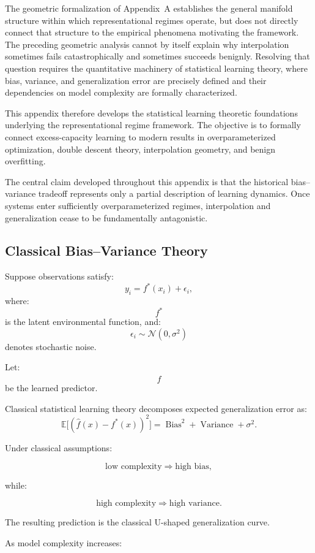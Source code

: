 \documentclass[12pt,a4paper]{article}
\begin{document}
The geometric formalization of Appendix~A establishes the general manifold structure within which representational regimes operate, but does not directly connect that structure to the empirical phenomena motivating the framework. The preceding geometric analysis cannot by itself explain why interpolation sometimes fails catastrophically and sometimes succeeds benignly. Resolving that question requires the quantitative machinery of statistical learning theory, where bias, variance, and generalization error are precisely defined and their dependencies on model complexity are formally characterized.

This appendix therefore develops the statistical learning theoretic foundations underlying the representational regime framework. The objective is to formally connect excess-capacity learning to modern results in overparameterized optimization, double descent theory, interpolation geometry, and benign overfitting.

The central claim developed throughout this appendix is that the historical bias--variance tradeoff represents only a partial description of learning dynamics. Once systems enter sufficiently overparameterized regimes, interpolation and generalization cease to be fundamentally antagonistic.

\subsection{Classical Bias--Variance Theory}

Suppose observations satisfy:
\[
y_i
=
f^\ast(x_i)
+
\epsilon_i,
\]
where:
\[
f^\ast
\]
is the latent environmental function,
and:
\[
\epsilon_i
\sim
\mathcal{N}(0,\sigma^2)
\]
denotes stochastic noise.

Let:
\[
\hat{f}
\]
be the learned predictor.

Classical statistical learning theory decomposes expected generalization error as:
\[
\mathbb{E}
\big[
(\hat{f}(x)-f^\ast(x))^2
\big]
=
\operatorname{Bias}^2
+
\operatorname{Variance}
+
\sigma^2.
\]

Under classical assumptions:

\[
\text{low complexity}
\Rightarrow
\text{high bias},
\]

while:

\[
\text{high complexity}
\Rightarrow
\text{high variance}.
\]

The resulting prediction is the classical U-shaped generalization curve.

As model complexity increases:
\end{document}
